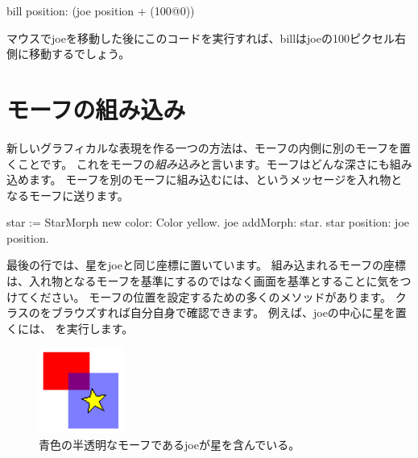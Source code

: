 \documentclass[a4paper,10pt,twoside]{book}
\begin{document}
\begin{code}{}
bill position: (joe position + (100@0))
\end{code}
\noindent
マウスでjoeを移動した後にこのコードを実行すれば、billはjoeの100ピクセル右側に移動するでしょう。

\section{モーフの組み込み}

新しいグラフィカルな表現を作る一つの方法は、モーフの内側に別のモーフを置くことです。
これをモーフの\emph{組み込み}と言います。モーフはどんな深さにも組み込めます。
%
モーフを別のモーフに組み込むには、というメッセージを入れ物となるモーフに送ります。

\begin{code}{}
star := StarMorph new color: Color yellow.
joe addMorph: star.
star position: joe position.
\end{code}

\noindent
最後の行では、星をjoeと同じ座標に置いています。
組み込まれるモーフの座標は、入れ物となるモーフを基準にするのではなく画面を基準とすることに気をつけてください。
モーフの位置を設定するための多くのメソッドがあります。
クラスのをブラウズすれば自分自身で確認できます。
例えば、joeの中心に星を置くには、  を実行します。

\begin{figure}[ht]
	\centerline{\includegraphics{joeStar}}
	\caption{青色の半透明なモーフであるjoeが星を含んでいる。
		}
\end{figure}
\end{document}
